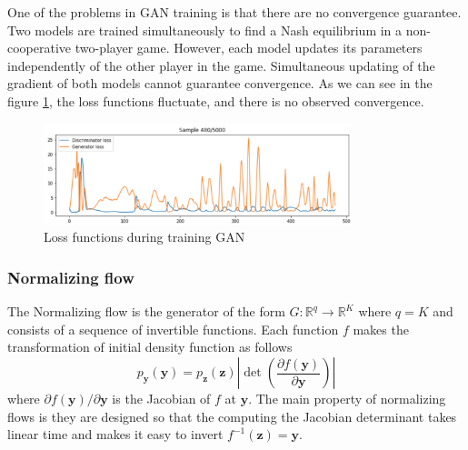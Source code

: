 \documentclass[12pt,a4paper]{article}
\begin{document}
One of the problems in GAN training is that there are no convergence guarantee. Two models are trained simultaneously to find a Nash equilibrium in a non-cooperative two-player game. However, each model updates its parameters independently of the other player in the game. Simultaneous updating of the gradient of both models cannot guarantee convergence. As we can see in the figure \ref{fig:gan}, the loss functions fluctuate, and there is no observed convergence.

\begin{figure}[!ht]
    \centering
    \includegraphics[width=0.8\textwidth]{figures/gan.png}
    \caption{Loss functions during training GAN}
    \label{fig:gan}
\end{figure}

\subsubsection{Normalizing flow}

The Normalizing flow \cite{normflow2021} is the generator of the form $G: \mathbb R^q \to \mathbb R^K$ where $q=K$ and consists of a sequence of invertible functions. Each function $f$ makes the transformation of initial density function as follows
$$p_{\mathbf{y}}(\mathbf{y})=p_{\mathbf{z}}(\mathbf{z})\left|\operatorname{det}\left(\frac{\partial f(\mathbf{y})}{\partial \mathbf{y}}\right)\right|$$
where $\partial f(\mathbf y)/\partial \mathbf y$ is the Jacobian of $f$ at $\mathbf y$. The main property of normalizing flows is they are designed so that the computing the Jacobian determinant takes linear time and makes it easy to invert $f^{-1}(\mathbf z) = \mathbf y$.
\end{document}
